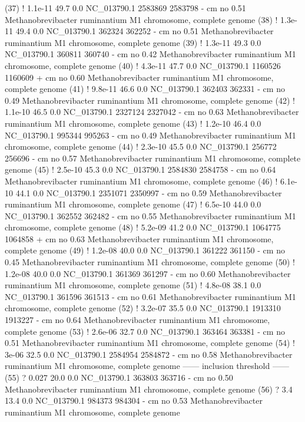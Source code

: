 \begin{sreoutput}
 (37) !   1.1e-11   49.7   0.0  NC_013790.1 2583869 2583798 -  cm    no 0.51  Methanobrevibacter ruminantium M1 chromosome, complete genome
 (38) !   1.3e-11   49.4   0.0  NC_013790.1  362324  362252 -  cm    no 0.51  Methanobrevibacter ruminantium M1 chromosome, complete genome
 (39) !   1.3e-11   49.3   0.0  NC_013790.1  360811  360740 -  cm    no 0.42  Methanobrevibacter ruminantium M1 chromosome, complete genome
 (40) !   4.3e-11   47.7   0.0  NC_013790.1 1160526 1160609 +  cm    no 0.60  Methanobrevibacter ruminantium M1 chromosome, complete genome
 (41) !   9.8e-11   46.6   0.0  NC_013790.1  362403  362331 -  cm    no 0.49  Methanobrevibacter ruminantium M1 chromosome, complete genome
 (42) !   1.1e-10   46.5   0.0  NC_013790.1 2327124 2327042 -  cm    no 0.63  Methanobrevibacter ruminantium M1 chromosome, complete genome
 (43) !   1.2e-10   46.4   0.0  NC_013790.1  995344  995263 -  cm    no 0.49  Methanobrevibacter ruminantium M1 chromosome, complete genome
 (44) !   2.3e-10   45.5   0.0  NC_013790.1  256772  256696 -  cm    no 0.57  Methanobrevibacter ruminantium M1 chromosome, complete genome
 (45) !   2.5e-10   45.3   0.0  NC_013790.1 2584830 2584758 -  cm    no 0.64  Methanobrevibacter ruminantium M1 chromosome, complete genome
 (46) !   6.1e-10   44.1   0.0  NC_013790.1 2351071 2350997 -  cm    no 0.59  Methanobrevibacter ruminantium M1 chromosome, complete genome
 (47) !   6.5e-10   44.0   0.0  NC_013790.1  362552  362482 -  cm    no 0.55  Methanobrevibacter ruminantium M1 chromosome, complete genome
 (48) !   5.2e-09   41.2   0.0  NC_013790.1 1064775 1064858 +  cm    no 0.63  Methanobrevibacter ruminantium M1 chromosome, complete genome
 (49) !   1.2e-08   40.0   0.0  NC_013790.1  361222  361150 -  cm    no 0.45  Methanobrevibacter ruminantium M1 chromosome, complete genome
 (50) !   1.2e-08   40.0   0.0  NC_013790.1  361369  361297 -  cm    no 0.60  Methanobrevibacter ruminantium M1 chromosome, complete genome
 (51) !   4.8e-08   38.1   0.0  NC_013790.1  361596  361513 -  cm    no 0.61  Methanobrevibacter ruminantium M1 chromosome, complete genome
 (52) !   3.2e-07   35.5   0.0  NC_013790.1 1913310 1913227 -  cm    no 0.64  Methanobrevibacter ruminantium M1 chromosome, complete genome
 (53) !   2.6e-06   32.7   0.0  NC_013790.1  363464  363381 -  cm    no 0.51  Methanobrevibacter ruminantium M1 chromosome, complete genome
 (54) !     3e-06   32.5   0.0  NC_013790.1 2584954 2584872 -  cm    no 0.58  Methanobrevibacter ruminantium M1 chromosome, complete genome
 ------ inclusion threshold ------
 (55) ?     0.027   20.0   0.0  NC_013790.1  363803  363716 -  cm    no 0.50  Methanobrevibacter ruminantium M1 chromosome, complete genome
 (56) ?       3.4   13.4   0.0  NC_013790.1  984373  984304 -  cm    no 0.53  Methanobrevibacter ruminantium M1 chromosome, complete genome
\end{sreoutput}

